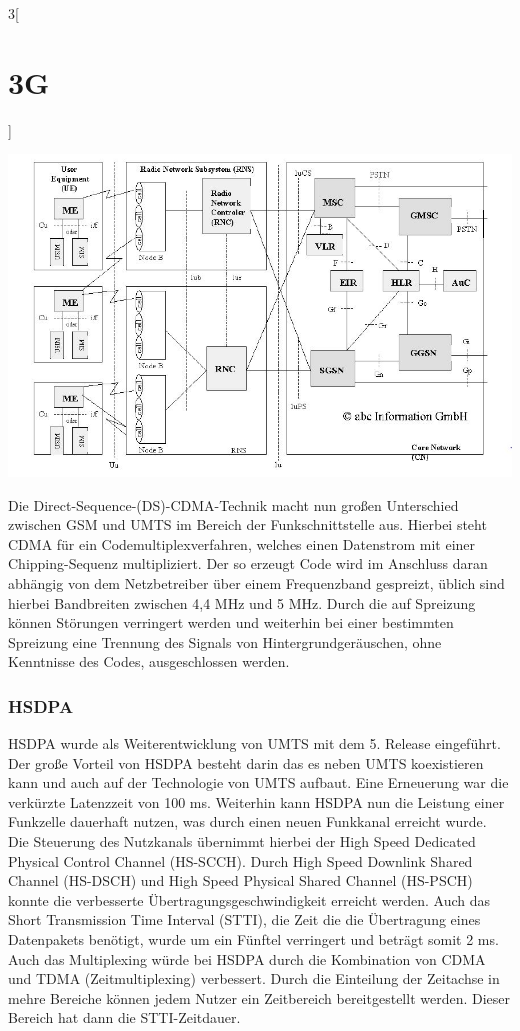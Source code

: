\begin{multicols}{3}[\section{3G}]
\begin{Figure}
\includegraphics[width=\linewidth]{Kapitel/3G/Grafiken/Architektur.jpg}
\label{fig:vorlage.vorlesungssaal}
\end{Figure}

Die Direct-Sequence-(DS)-CDMA-Technik macht nun großen Unterschied zwischen GSM und UMTS im Bereich der Funkschnittstelle aus. Hierbei steht CDMA für ein Codemultiplexverfahren, welches einen Datenstrom mit einer Chipping-Sequenz multipliziert. Der so erzeugt Code wird im Anschluss daran abhängig von dem Netzbetreiber über einem Frequenzband gespreizt, üblich sind hierbei Bandbreiten zwischen 4,4 MHz und 5 MHz. Durch die auf Spreizung können Störungen verringert werden und weiterhin bei einer bestimmten Spreizung eine Trennung des Signals von Hintergrundgeräuschen, ohne Kenntnisse des Codes, ausgeschlossen werden.~\cite{3G.1, 3G.4}


\subsubsection*{HSDPA}
HSDPA wurde als Weiterentwicklung von UMTS mit dem 5. Release eingeführt.  Der große Vorteil von HSDPA besteht darin das es neben UMTS koexistieren kann und auch auf der Technologie von UMTS aufbaut. Eine Erneuerung war die verkürzte Latenzzeit von 100 ms. Weiterhin kann HSDPA nun die Leistung einer Funkzelle dauerhaft nutzen, was durch einen neuen Funkkanal erreicht wurde. Die Steuerung des Nutzkanals übernimmt hierbei der High Speed Dedicated Physical Control Channel (HS-SCCH). Durch High Speed Downlink Shared Channel (HS-DSCH) und High Speed Physical Shared Channel (HS-PSCH) konnte die verbesserte Übertragungsgeschwindigkeit erreicht werden. Auch das Short Transmission Time Interval (STTI), die Zeit die die Übertragung eines Datenpakets benötigt, wurde um ein Fünftel verringert und beträgt somit 2 ms.  Auch das Multiplexing würde bei HSDPA durch die Kombination von CDMA und TDMA (Zeitmultiplexing) verbessert. Durch die Einteilung der Zeitachse in mehre Bereiche können jedem Nutzer ein Zeitbereich bereitgestellt werden. Dieser Bereich hat dann die STTI-Zeitdauer.~\cite{3G.1, 3G.3}


\end{multicols}
